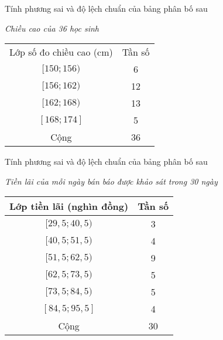 \begin{bt}%
	Tính phương sai và độ lệch chuẩn của bảng phân bố sau
	\begin{center}
		\emph{Chiều cao của 36 học sinh}\\
		\begin{tabular}{|c|c|}
			\hline
			Lớp số đo chiều cao (cm) & Tần số\\
			$[150;156)$ & 6\\
			$[156;162)$ & 12\\
			$[162;168)$ & 13\\
			$[168;174]$ & 5\\\hline
			Cộng & 36\\\hline
		\end{tabular}
	\end{center}
\end{bt}
\begin{bt}%
	Tính phương sai và độ lệch chuẩn của bảng phân bố sau
	\begin{center}
		\emph{Tiền lãi của mỗi ngày bán báo được khảo sát trong 30 ngày}\\
		\begin{tabular}{|c|c|}
			\hline
			Lớp tiền lãi (nghìn đồng) & Tần số\\\hline
			$[29,5;40,5)$ & 3\\
			$[40,5;51,5)$ & 4\\
			$[51,5;62,5)$ & 9\\
			$[62,5;73,5)$ & 5 \\
			$[73,5;84,5)$ & 5 \\
			$[84,5;95,5]$ & 4\\\hline
			Cộng & 30\\\hline
		\end{tabular}
	\end{center}
\end{bt}
